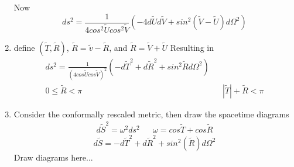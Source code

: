 \documentclass[10pt]{article}
\begin{document}
\begin{enumerate}
               	Now
               	\begin{equation}
               	    ds^2=\frac{1}{4cos^2\widetilde{U}cos^2\widetilde{V}}(-4d\widetilde{U}d\widetilde{V}+sin^2(\widetilde{V}-\widetilde{U})d\Omega^2)
               	\end{equation}
               	
               	\item define \((\widetilde{T},\widetilde{R})\), \(\widetilde{R}=\widetilde{v}-\widetilde{R}\), and \(\widetilde{R}=\widetilde{V}+\widetilde{U}\)
               	Resulting in 
               	\begin{equation}
               	 \begin{align} ds^2=\frac{1}{(4cos\widetilde{U}cos\widetilde{V})^2}(-d\widetilde{T}^2+d\widetilde{R}^2+sin^2\widetilde{R}d\Omega^2)\\
               	  0\leq{\widetilde{R}}<\pi && |\widetilde{T}|+\widetilde{R}<\pi
               	  \end{align}
               	\end{equation}
               	\item Consider the conformally rescaled metric, then draw the spacetime diagrams
               	\begin{equation}
               	   \begin{align} d\widetilde{S}^2=\omega^2ds^2 &&  \omega=cos\widetilde{T}+cos\widetilde{R}
               	   \end{align}
               	\end{equation}
               	\begin{equation}
               	    d\widetilde{S}=-d\widetilde{T}^2+d\widetilde{R}^2+sin^2(\widetilde{R})d\Omega^2
               	\end{equation}
               	Draw diagrams here...
             \end{enumerate}
             
    \newpage
    
\end{document}
